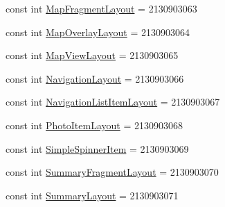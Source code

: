 \begin{DoxyCompactItemize}
const int \hyperlink{class_field_service_1_1_android_1_1_resource_1_1_layout_ad5fc540e8437f7add12be0ce530d2d80}{Map\+Fragment\+Layout} = 2130903063
\item 
const int \hyperlink{class_field_service_1_1_android_1_1_resource_1_1_layout_a6057a04d37f74fc36366704e061ab92d}{Map\+Overlay\+Layout} = 2130903064
\item 
const int \hyperlink{class_field_service_1_1_android_1_1_resource_1_1_layout_aa106426a966e27551d3f188333d174fc}{Map\+View\+Layout} = 2130903065
\item 
const int \hyperlink{class_field_service_1_1_android_1_1_resource_1_1_layout_a249bd28dcbcefd893dc25aacebfd45bd}{Navigation\+Layout} = 2130903066
\item 
const int \hyperlink{class_field_service_1_1_android_1_1_resource_1_1_layout_a494c67baf3fa6b282f2e4f6676d2645e}{Navigation\+List\+Item\+Layout} = 2130903067
\item 
const int \hyperlink{class_field_service_1_1_android_1_1_resource_1_1_layout_a5b53d6c04993d213559475d704daa150}{Photo\+Item\+Layout} = 2130903068
\item 
const int \hyperlink{class_field_service_1_1_android_1_1_resource_1_1_layout_aec5d828257e632e6314fca6b7ad7de99}{Simple\+Spinner\+Item} = 2130903069
\item 
const int \hyperlink{class_field_service_1_1_android_1_1_resource_1_1_layout_a95e07a4fbce9ce87d850ee490e99426f}{Summary\+Fragment\+Layout} = 2130903070
\item 
const int \hyperlink{class_field_service_1_1_android_1_1_resource_1_1_layout_a3ed0e2cf2787430c31abf7748af24809}{Summary\+Layout} = 2130903071
\end{DoxyCompactItemize}


